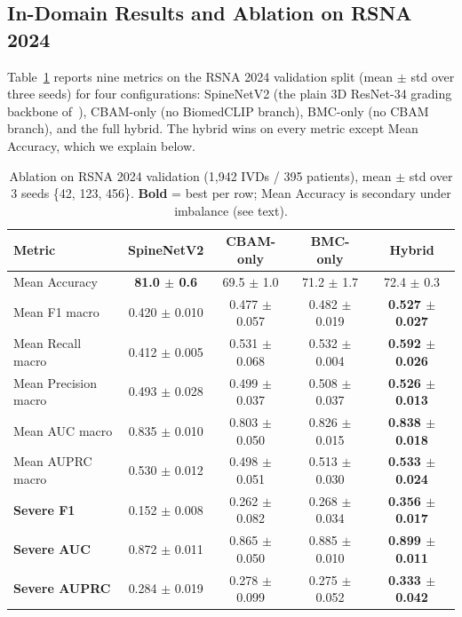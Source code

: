 \documentclass[runningheads]{llncs}
\newcommand{\best}[1]{\textcolor{best}{\textbf{#1}}}
\begin{document}
\subsection{In-Domain Results and Ablation on RSNA 2024}\label{exp2}

Table~\ref{tab:main} reports nine metrics on the RSNA 2024 validation split (mean $\pm$ std over three seeds) for four configurations: SpineNetV2 (the plain 3D ResNet-34 grading backbone of~\cite{windsor2022}), CBAM-only (no BiomedCLIP branch), BMC-only (no CBAM branch), and the full hybrid. The hybrid wins on every metric except Mean Accuracy, which we explain below.

\begin{table}[t]
\centering
\caption{Ablation on RSNA 2024 validation (1{,}942 IVDs / 395 patients), mean $\pm$ std over 3 seeds \{42, 123, 456\}. \textbf{Bold} = best per row; Mean Accuracy is secondary under imbalance (see text).}
\label{tab:main}
\footnotesize
\setlength{\tabcolsep}{4pt}
\begin{tabular}{@{}lcccc@{}}
\toprule
Metric & SpineNetV2 & CBAM-only & BMC-only & Hybrid \\
\midrule
Mean Accuracy        & \best{81.0 $\pm$ 0.6} & 69.5 $\pm$ 1.0 & 71.2 $\pm$ 1.7 & 72.4 $\pm$ 0.3 \\
Mean F1 macro        & 0.420 $\pm$ 0.010 & 0.477 $\pm$ 0.057 & 0.482 $\pm$ 0.019 & \best{0.527 $\pm$ 0.027} \\
Mean Recall macro    & 0.412 $\pm$ 0.005 & 0.531 $\pm$ 0.068 & 0.532 $\pm$ 0.004 & \best{0.592 $\pm$ 0.026} \\
Mean Precision macro & 0.493 $\pm$ 0.028 & 0.499 $\pm$ 0.037 & 0.508 $\pm$ 0.037 & \best{0.526 $\pm$ 0.013} \\
Mean AUC macro       & 0.835 $\pm$ 0.010 & 0.803 $\pm$ 0.050 & 0.826 $\pm$ 0.015 & \best{0.838 $\pm$ 0.018} \\
Mean AUPRC macro     & 0.530 $\pm$ 0.012 & 0.498 $\pm$ 0.051 & 0.513 $\pm$ 0.030 & \best{0.533 $\pm$ 0.024} \\
\midrule
\textbf{Severe F1}    & 0.152 $\pm$ 0.008 & 0.262 $\pm$ 0.082 & 0.268 $\pm$ 0.034 & \best{0.356 $\pm$ 0.017} \\
\textbf{Severe AUC}   & 0.872 $\pm$ 0.011 & 0.865 $\pm$ 0.050 & 0.885 $\pm$ 0.010 & \best{0.899 $\pm$ 0.011} \\
\textbf{Severe AUPRC} & 0.284 $\pm$ 0.019 & 0.278 $\pm$ 0.099 & 0.275 $\pm$ 0.052 & \best{0.333 $\pm$ 0.042} \\
\bottomrule
\end{tabular}
\end{table}
\end{document}
